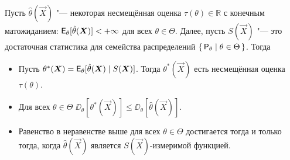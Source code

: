 \begin{theorem}
	Пусть $\hat{\theta}(\vec{X})$ "--- некоторая несмещённая оценка $\tau(\theta) \in \mathbb{R}$ с конечным матожиданием: $\operatorname{\mathsf{E}}_{\theta}[\hat{\theta}(\bm{X})] < +\infty$ для всех $\theta \in \Theta$. Далее, пусть $S(\vec{X})$ "--- это достаточная статистика для семейства распределений $\set{ \mathsf{P}_{\theta} \mid \theta \in \Theta}$. Тогда
	\begin{itemize}
		\item Пусть $\theta^{*}(\bm{X}) = \operatorname{\mathsf{E}}_{\theta}[\hat{\theta}(\bm{X}) \mid S(\bm{X})]$. Тогда $\theta^{*}(\vec{X})$ есть несмещённая оценка $\tau(\theta)$.
		\item Для всех $\theta \in \Theta$ $\DD_{\theta}[\theta^{*}(\vec{X})] \leq \DD_{\theta}[\hat{\theta}(\vec{X})]$.
		\item Равенство в неравенстве выше для всех $\theta \in \Theta$ достигается тогда и только тогда, когда $\hat{\theta}(\vec{X})$ является $S(\vec{X})$-измеримой функцией.
	\end{itemize}
\end{theorem}
